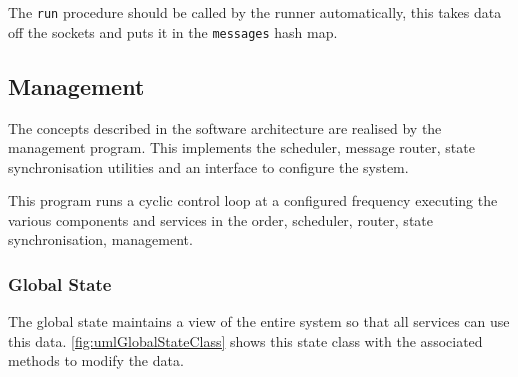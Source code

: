 The \verb|run| procedure should be called by the runner automatically, this takes data off the sockets and puts it in the \verb|messages| hash map.

\clearpage

\subsection{Management}
The concepts described in the software architecture are realised by the management program. This implements the scheduler, message router, state synchronisation utilities and an interface to configure the system.

This program runs a cyclic control loop at a configured frequency executing the various components and services in the order, scheduler, router, state synchronisation, management.

\subsubsection{Global State}
The global state maintains a view of the entire system so that all services can use this data. \autoref{fig:umlGlobalStateClass} shows this state class with the associated methods to modify the data.

